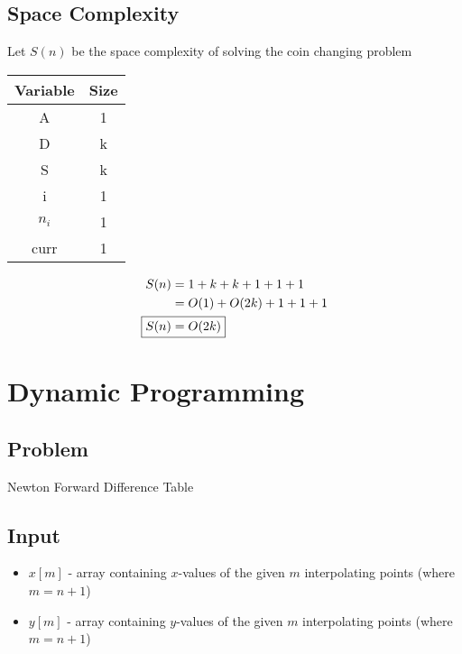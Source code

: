 \documentclass[12pt]{article}%
\begin{document}
  \subsection{Space Complexity}
    Let $S(n)$ be the space complexity of solving the coin changing problem
    \begin{table}[H]
    \centering
    \begin{tabular}{|c|c|}
    \hline
    \textbf{Variable} & \textbf{Size}          \\ \hline
    A                 & 1                      \\ \hline
    D                 & k                      \\ \hline
    S                 & k                      \\ \hline
    i                 & 1                      \\ \hline
    $n_i$             & 1                      \\ \hline
    curr              & 1                      \\ \hline
    \end{tabular}
    \end{table}
    \begin{align}
      S(n) &= 1 + k + k + 1 + 1 + 1 \\
      &= O(1) + O(2k) + 1 + 1 + 1 \\
      \Aboxed{S(n) &= O(2k)}
    \end{align}

    \newpage

\section{Dynamic Programming}
  \subsection{Problem}
    Newton Forward Difference Table
  \subsection{Input}
    \begin{itemize}
      \item $x[m]$ - array containing $x$-values of the given $m$ interpolating points (where $m = n + 1$)
      \item $y[m]$ - array containing $y$-values of the given $m$ interpolating points (where $m = n + 1$)
    \end{itemize}
\end{document}
